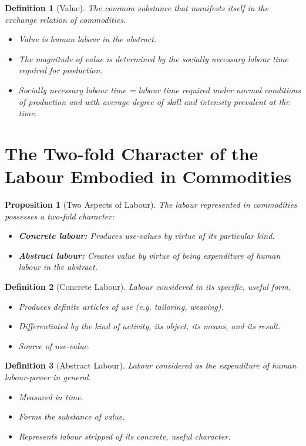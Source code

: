 \documentclass{article}
\newtheorem{definition}{Definition}[subsubsection]
\newtheorem{proposition}{Proposition}[subsubsection]
\begin{document}
\begin{definition}[Value]\label{def:1.1.1.3}
The common substance that manifests itself in the exchange relation of commodities.
\begin{itemize}[noitemsep]
  \item Value is human labour in the abstract.
  \item The magnitude of value is determined by the socially necessary labour time required for production.
  \item Socially necessary labour time = labour time required under normal conditions of production and with average degree of skill and intensity prevalent at the time.
\end{itemize}
\end{definition}

\section{The Two-fold Character of the Labour Embodied in Commodities}

\begin{proposition}[Two Aspects of Labour]\label{prop:1.1.2.1}
The labour represented in commodities possesses a two-fold character:
\begin{itemize}[noitemsep]
  \item \textbf{Concrete labour:} Produces use-values by virtue of its particular kind.
  \item \textbf{Abstract labour:} Creates value by virtue of being expenditure of human labour in the abstract.
\end{itemize}
\end{proposition}

\begin{definition}[Concrete Labour]\label{def:1.1.2.1}
Labour considered in its specific, useful form.
\begin{itemize}[noitemsep]
  \item Produces definite articles of use (e.g. tailoring, weaving).
  \item Differentiated by the kind of activity, its object, its means, and its result.
  \item Source of use-value.
\end{itemize}
\end{definition}

\begin{definition}[Abstract Labour]\label{def:1.1.2.2}
Labour considered as the expenditure of human labour-power in general.
\begin{itemize}[noitemsep]
  \item Measured in time.
  \item Forms the substance of value.
  \item Represents labour stripped of its concrete, useful character.
\end{itemize}
\end{definition}
\end{document}
